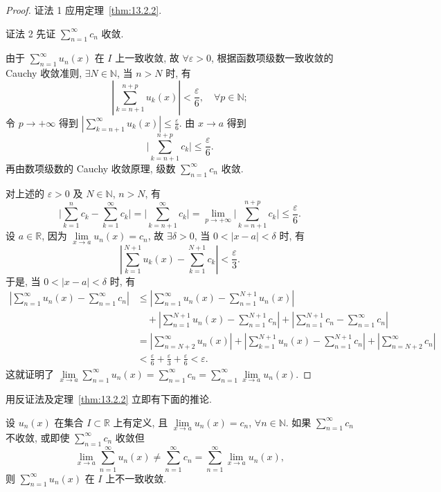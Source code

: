 \begin{proof}
证法 1 应用定理~\ref{thm:13.2.2}.

证法 2 先证 $\sum_{n=1}^{\infty}c_{n}$ 收敛.

由于 $\sum_{n=1}^{\infty}u_{n}(x)$ 在 $I$ 上一致收敛, 故 $\forall\varepsilon>0$, 根据函数项级数一致收敛的 Cauchy 收敛准则, $\exists N\in\mathbb{N}$, 当 $n>N$ 时, 有
\[
  \left|\sum_{k=n+1}^{n+p}u_{k}(x)\right|<\frac{\varepsilon}{6},\quad\forall p\in\mathbb{N};
\]
令 $p\to+\infty$ 得到 $\left|\sum_{k=n+1}^{\infty}u_{k}(x)\right|\leqslant\frac{\varepsilon}{6}$. 由 $x\to a$ 得到
\[
  \Big|\sum_{k=n+1}^{n+p}c_{k}\Big|\leqslant\frac{\varepsilon}{6}.
\]
再由数项级数的 Cauchy 收敛原理, 级数 $\sum_{n=1}^{\infty}c_{n}$ 收敛.

对上述的 $\varepsilon>0$ 及 $N\in\mathbb{N}$, $n>N$, 有
\[
  \Big|\sum_{k=1}^{n}c_{k}-\sum_{k=1}^{\infty}c_{k}\Big|=\Big|\sum_{k=n+1}^{\infty}c_{k}\Big|=\lim_{p\to+\infty}\Big|\sum_{k=n+1}^{n+p}c_{k}\Big|\leqslant\frac{\varepsilon}{6}.
\]
设 $a\in\mathbb{R}$, 因为 $\lim\limits_{x\to a}u_{n}(x)=c_{n}$, 故 $\exists\delta>0$, 当 $0<|x-a|<\delta$ 时, 有
\[
  \left|\sum_{k=1}^{N+1}u_{k}(x)-\sum_{k=1}^{N+1}c_{k}\right|<\frac{\varepsilon}{3}.
\]
于是, 当 $0<|x-a|<\delta$ 时, 有
\[
  \begin{aligned}
    \left|\sum_{n=1}^{\infty}u_{n}(x)-\sum_{n=1}^{\infty}c_{n}\right|&\leqslant\left|\sum_{n=1}^{\infty}u_{n}(x)-\sum_{n=1}^{N+1}u_{n}(x)\right|\\
    &\quad+\left|\sum_{n=1}^{N+1}u_{n}(x)-\sum_{n=1}^{N+1}c_{n}\right|+\left|\sum_{n=1}^{N+1}c_{n}-\sum_{n=1}^{\infty}c_{n}\right|\\
    &=\left|\sum_{n=N+2}^{\infty}u_{n}(x)\right|+\left|\sum_{k=1}^{N+1}u_{n}(x)-\sum_{n=1}^{N+1}c_{n}\right|+\left|\sum_{n=N+2}^{\infty}c_{n}\right|\\
    &<\frac{\varepsilon}{6}+\frac{\varepsilon}{3}+\frac{\varepsilon}{6}<\varepsilon.
  \end{aligned}
\]
这就证明了 $\lim\limits_{x\to a}\sum_{n=1}^{\infty}u_{n}(x)=\sum_{n=1}^{\infty}c_{n}=\sum_{n=1}^{\infty}\lim\limits_{x\to a}u_{n}(x)$.
\end{proof}

用反证法及定理~\ref{thm:13.2.2} 立即有下面的推论.

\setcounter{corollary}{2}
\begin{corollaryp}\label{cor:13.2.2p}
设 $u_{n}(x)$ 在集合 $I\subset\mathbb{R}$ 上有定义, 且 $\lim\limits_{x\to a}u_{n}(x)=c_{n}$, $\forall n\in\mathbb{N}$. 如果 $\sum_{n=1}^{\infty}c_{n}$ 不收敛, 或即使 $\sum_{n=1}^{\infty}c_{n}$ 收敛但
\[
  \lim_{x\to a}\sum_{n=1}^{\infty}u_{n}(x)\neq\sum_{n=1}^{\infty}c_{n}=\sum_{n=1}^{\infty}\lim_{x\to a}u_{n}(x),
\]
则 $\sum_{n=1}^{\infty}u_{n}(x)$ 在 $I$ 上不一致收敛.
\end{corollaryp}

